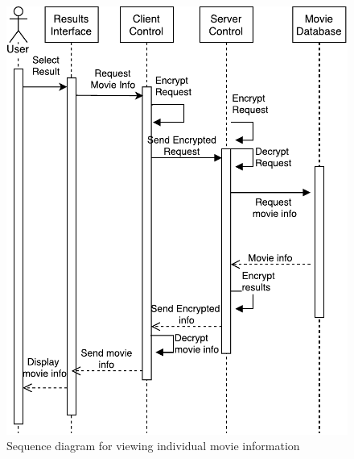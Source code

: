 \documentclass[]{article}
\begin{document}
\begin{figure}[H]
	\includegraphics[width=\textwidth]{SD3}
	\centering
	\caption{Sequence diagram for viewing individual movie information}
\end{figure}
\end{document}
